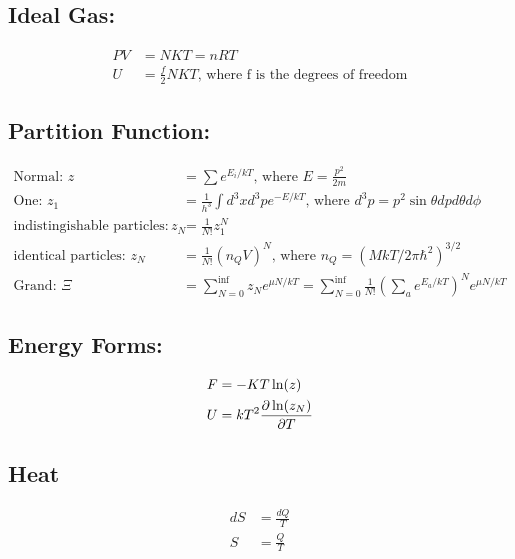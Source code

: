 \subsection*{Ideal Gas:}
\begin{align}
	PV & = NKT = nRT                                                 \\
	U  & = \frac{f}{2} NKT \text{, where f is the degrees of freedom}
\end{align}

\subsection*{Partition Function:}

\begin{align}
	\text{Normal:  } z                      & = \sum e^{E_i / kT} \text{, where } E = \frac{p^2}{2m}                                                         \\
	\text{One: } z_1                        & = \frac{1}{h^3} \int d^3x d^3p e^{-E/ kT}\text{, where } d^3p = p^2\sin\theta dp d\theta d\phi                 \\
	\text{indistingishable particles: } z_N & = \frac{1}{N!} z_1^N                                                                                           \\
	\text{identical particles: } z_N        & = \frac{1}{N!} (n_Q V)^N \text{, where }n_Q=(MkT/2\pi \hbar^2)^{3/2}                                           \\
	\text{Grand: } \Xi                      & = \sum_{N=0}^{\inf} z_N e^{\mu N / kT} = \sum_{N=0}^{\inf} \frac{1}{N!} (\sum_a e^{E_a / kT})^N e^{\mu N / kT}
\end{align}


\subsection*{Energy Forms:}
\begin{align}
	F & = - KT \ln(z)             \\
	U & = k T^2 \pdv{\ln(z_N)}{T}
\end{align}

\subsection*{Heat}
\begin{align}
	dS & = \frac{dQ}{T} \\
	S  & = \frac{Q}{T}
\end{align}

